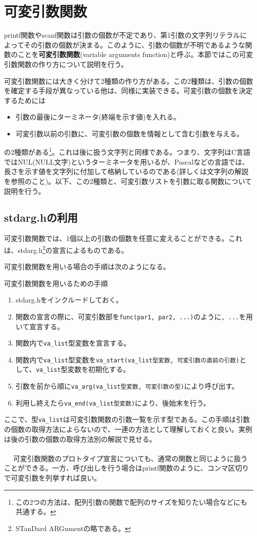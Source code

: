 \section{可変引数関数}
printf関数やscanf関数は引数の個数が不定であり、第1引数の文字列リテラルによってその引数の個数が決まる。このように、引数の個数が不明であるような関数のことを\textbf{可変引数関数}(variable arguments function)と呼ぶ。本節ではこの可変引数関数の作り方について説明を行う。

可変引数関数には大きく分けて2種類の作り方がある。この2種類は、引数の個数を確定する手段が異なっている他は、同様に実装できる。可変引数の個数を決定するためには
　\begin{itemize}
  \item 引数の最後にターミネータ(終端を示す値)を入れる。
  \item 可変引数以前の引数に、可変引数の個数を情報として含む引数を与える。
　\end{itemize}
の2種類がある\footnote{この2つの方法は、配列引数の関数で配列のサイズを知りたい場合などにも共通する。}。これは後に扱う文字列と同様である。つまり、文字列はC言語ではNUL(NULL文字)というターミネータを用いるが、Pascalなどの言語では、長さを示す値を文字列に付加して格納しているのである(詳しくは文字列の解説を参照のこと)。以下、この2種類と、可変引数リストを引数に取る関数について説明を行う。
\subsection{stdarg.hの利用}
可変引数関数では、1個以上の引数の個数を任意に変えることができる。これは、stdarg.h\footnote{STanDard ARGumentの略である。}の宣言によるものである。

可変引数関数を用いる場合の手順は次のようになる。
\begin{itembox}[l]{可変引数関数を用いるための手順}
\begin{enumerate}
\item stdarg.hをインクルードしておく。
\item 関数の宣言の際に、可変引数部を\verb|func(par1, par2, ...)|のように\verb|, ...|を用いて宣言する。
\item 関数内で\verb|va_list|型変数を宣言する。
\item 関数内で\verb|va_list|型変数を\verb|va_start(va_list型変数, 可変引数の直前の引数)|として、\verb|va_list|型変数を初期化する。
\item 引数を前から順に\verb|va_arg(va_list型変数, 可変引数の型)|により呼び出す。
\item 利用し終えたら\verb|va_end(va_list型変数)|により、後始末を行う。
\end{enumerate}
\end{itembox}
ここで、型\verb|va_list|は可変引数関数の引数一覧を示す型である。この手順は引数の個数の取得方法によらないので、一連の方法として理解しておくと良い。実例は後の引数の個数の取得方法別の解説で見せる。
\\ \\　
可変引数関数のプロトタイプ宣言についても、通常の関数と同じように扱うことができる。一方、呼び出しを行う場合はprintf関数のように、コンマ区切りで可変引数を列挙すれば良い。

